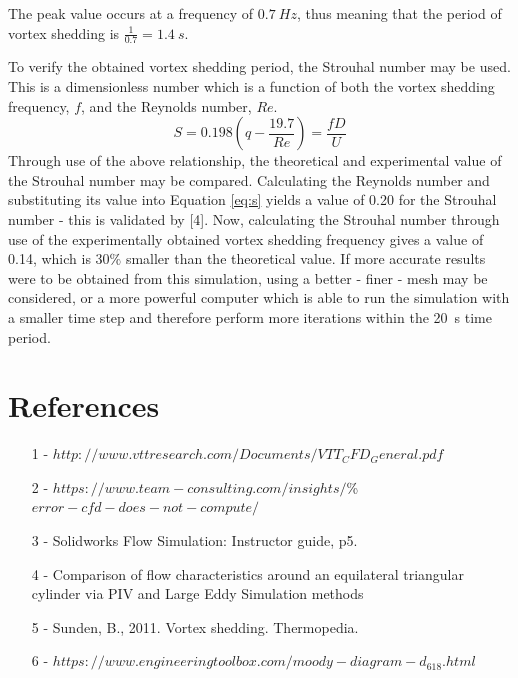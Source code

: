 \documentclass[a4paper,11pt,onecolumn]{article}
\begin{document}
The peak value occurs at a frequency of $0.7~Hz$, thus meaning that the period
of vortex shedding is $\frac{1}{0.7} = 1.4~s$.

To verify the obtained vortex shedding period, the Strouhal number may be used.
This is a dimensionless number which is a function of both the vortex shedding
frequency, $f$, and the Reynolds number, $Re$.
\begin{equation}
    S = 0.198(q-\frac{19.7}{Re}) = \frac{fD}{U}
    \label{eq:s}
\end{equation}
Through use of the above relationship, the theoretical and experimental
value of the Strouhal number may be compared. Calculating the Reynolds number
and substituting its value into Equation \ref{eq:s} yields a value of 0.20 for
the Strouhal number - this is validated by [4]. Now, calculating
the Strouhal number through use of the experimentally obtained vortex shedding
frequency gives a value of 0.14, which is $30\%$ smaller than the theoretical
value. If more accurate results were to be obtained from this simulation, using
a better - finer - mesh may be considered, or a more powerful computer which is
able to run the simulation with a smaller time step and therefore perform
more iterations within the 20~s time period. 

\section{References}
\begin{itemize}
\item [1] - $http://www.vttresearch.com/Documents/VTT_CFD_General.pdf$
\item [2] -
$https://www.team-consulting.com/insights/$\%$error-cfd-does-not-compute/$
\item [3] - Solidworks Flow Simulation: Instructor guide, p5.
\item [4] - Comparison of flow characteristics around an equilateral triangular
cylinder via PIV and Large Eddy Simulation methods
\item [5] - Sunden, B., 2011. Vortex shedding. Thermopedia.
\item [6] - $https://www.engineeringtoolbox.com/moody-diagram-d_618.html$
\end{itemize}
\end{document}
